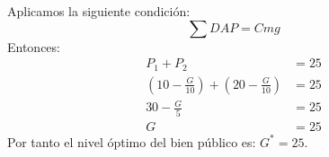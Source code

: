 Aplicamos la siguiente condición:
	$$\sum DAP = Cmg$$
Entonces:
	\begin{align*}
		P_{1} + P_{2} &= 25\\
		\left(10 - \frac{G}{10}\right) + \left(20 - \frac{G}{10}\right) &= 25\\
		30 - \frac{G}{5} &= 25\\
		G &= 25
	\end{align*}
Por tanto el nivel óptimo del bien público es: $G^* = 25$.
